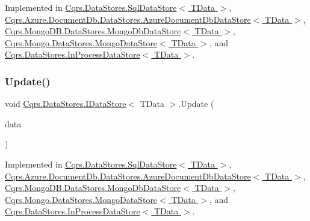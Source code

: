 Implemented in \hyperlink{classCqrs_1_1DataStores_1_1SqlDataStore_abb88337dccf3d5372f6b0920d5d26ebd_abb88337dccf3d5372f6b0920d5d26ebd}{Cqrs.\+Data\+Stores.\+Sql\+Data\+Store$<$ T\+Data $>$}, \hyperlink{classCqrs_1_1Azure_1_1DocumentDb_1_1DataStores_1_1AzureDocumentDbDataStore_a0d72cc318e98e01b3dbed86d412a8778_a0d72cc318e98e01b3dbed86d412a8778}{Cqrs.\+Azure.\+Document\+Db.\+Data\+Stores.\+Azure\+Document\+Db\+Data\+Store$<$ T\+Data $>$}, \hyperlink{classCqrs_1_1MongoDB_1_1DataStores_1_1MongoDbDataStore_ac0cb8626e8f8ab0275a31e88a920ee3e_ac0cb8626e8f8ab0275a31e88a920ee3e}{Cqrs.\+Mongo\+D\+B.\+Data\+Stores.\+Mongo\+Db\+Data\+Store$<$ T\+Data $>$}, \hyperlink{classCqrs_1_1Mongo_1_1DataStores_1_1MongoDataStore_a878966ea796321cae54c3c619e3178d5_a878966ea796321cae54c3c619e3178d5}{Cqrs.\+Mongo.\+Data\+Stores.\+Mongo\+Data\+Store$<$ T\+Data $>$}, and \hyperlink{classCqrs_1_1DataStores_1_1InProcessDataStore_acd350f7abef7311064434ae31a50755b_acd350f7abef7311064434ae31a50755b}{Cqrs.\+Data\+Stores.\+In\+Process\+Data\+Store$<$ T\+Data $>$}.

\mbox{\label{interfaceCqrs_1_1DataStores_1_1IDataStore_a6d5d4dd572de8db01ff0c48d37faefa7_a6d5d4dd572de8db01ff0c48d37faefa7}} 
\subsubsection{\texorpdfstring{Update()}{Update()}}
{\footnotesize\ttfamily void \hyperlink{interfaceCqrs_1_1DataStores_1_1IDataStore}{Cqrs.\+Data\+Stores.\+I\+Data\+Store}$<$ T\+Data $>$.Update (\begin{DoxyParamCaption}\item[{T\+Data}]{data }\end{DoxyParamCaption})}



Implemented in \hyperlink{classCqrs_1_1DataStores_1_1SqlDataStore_a8f85191cecef92d003620d4064584bb2_a8f85191cecef92d003620d4064584bb2}{Cqrs.\+Data\+Stores.\+Sql\+Data\+Store$<$ T\+Data $>$}, \hyperlink{classCqrs_1_1Azure_1_1DocumentDb_1_1DataStores_1_1AzureDocumentDbDataStore_a55f504ed5094e3041a266b958424b1a2_a55f504ed5094e3041a266b958424b1a2}{Cqrs.\+Azure.\+Document\+Db.\+Data\+Stores.\+Azure\+Document\+Db\+Data\+Store$<$ T\+Data $>$}, \hyperlink{classCqrs_1_1MongoDB_1_1DataStores_1_1MongoDbDataStore_af86a3df56e2df92fb9ef880ff4fa5f16_af86a3df56e2df92fb9ef880ff4fa5f16}{Cqrs.\+Mongo\+D\+B.\+Data\+Stores.\+Mongo\+Db\+Data\+Store$<$ T\+Data $>$}, \hyperlink{classCqrs_1_1Mongo_1_1DataStores_1_1MongoDataStore_a03aac0495445d34f124db893cd09cbd8_a03aac0495445d34f124db893cd09cbd8}{Cqrs.\+Mongo.\+Data\+Stores.\+Mongo\+Data\+Store$<$ T\+Data $>$}, and \hyperlink{classCqrs_1_1DataStores_1_1InProcessDataStore_af70e6f6e5aabc24ee12ef3d2bcd3bf60_af70e6f6e5aabc24ee12ef3d2bcd3bf60}{Cqrs.\+Data\+Stores.\+In\+Process\+Data\+Store$<$ T\+Data $>$}.

